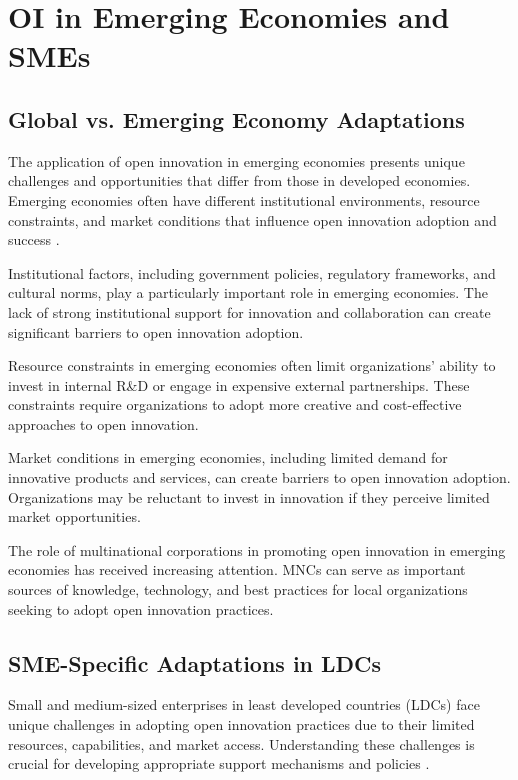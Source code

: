 \documentclass[12pt,a4paper]{article}
\begin{document}
\section{OI in Emerging Economies and SMEs}

\subsection{Global vs. Emerging Economy Adaptations}

The application of open innovation in emerging economies presents unique challenges and opportunities that differ from those in developed economies. Emerging economies often have different institutional environments, resource constraints, and market conditions that influence open innovation adoption and success \cite{liu2011open}.

Institutional factors, including government policies, regulatory frameworks, and cultural norms, play a particularly important role in emerging economies. The lack of strong institutional support for innovation and collaboration can create significant barriers to open innovation adoption.

Resource constraints in emerging economies often limit organizations' ability to invest in internal R\&D or engage in expensive external partnerships. These constraints require organizations to adopt more creative and cost-effective approaches to open innovation.

Market conditions in emerging economies, including limited demand for innovative products and services, can create barriers to open innovation adoption. Organizations may be reluctant to invest in innovation if they perceive limited market opportunities.

The role of multinational corporations in promoting open innovation in emerging economies has received increasing attention. MNCs can serve as important sources of knowledge, technology, and best practices for local organizations seeking to adopt open innovation practices.

\subsection{SME-Specific Adaptations in LDCs}

Small and medium-sized enterprises in least developed countries (LDCs) face unique challenges in adopting open innovation practices due to their limited resources, capabilities, and market access. Understanding these challenges is crucial for developing appropriate support mechanisms and policies \cite{spithoven2013open}.
\end{document}
